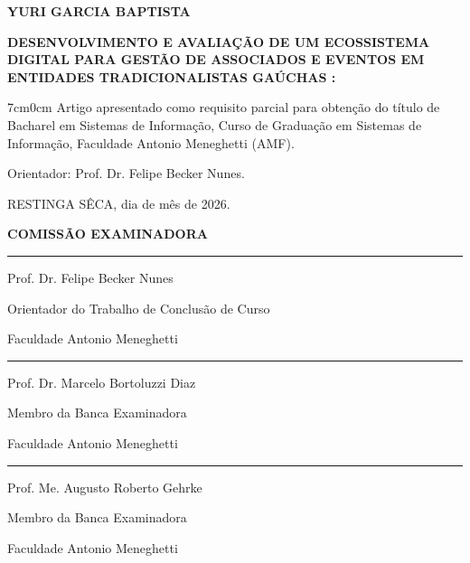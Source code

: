 \documentclass[12pt,a4paper]{article}
\newcommand{\autor}{YURI GARCIA BAPTISTA}
\newcommand{\titulo}{DESENVOLVIMENTO E AVALIAÇÃO DE UM ECOSSISTEMA DIGITAL PARA GESTÃO DE ASSOCIADOS E EVENTOS EM ENTIDADES TRADICIONALISTAS GAÚCHAS}
\newcommand{\subtitulo}{}
\newcommand{\grau}{Bacharel em Sistemas de Informação}
\newcommand{\orientador}{Prof. Dr. Felipe Becker Nunes}
\newcommand{\cidade}{RESTINGA SÊCA}
\newcommand{\datadefesa}{dia de mês de 2026}
\newcommand{\membrodois}{Prof. Dr. Marcelo Bortoluzzi Diaz}
\newcommand{\instituicaomembrodois}{Faculdade Antonio Meneghetti}
\newcommand{\membrotres}{Prof. Me. Augusto Roberto Gehrke}
\newcommand{\instituicaomembrotres}{Faculdade Antonio Meneghetti}
\newcommand{\imprimirtitulo}{%
  \titulo%
  \if\relax\detokenize\expandafter{\subtitulo}\relax
  \else: \subtitulo\fi
}
\begin{document}
\begin{titlepage}
  \thispagestyle{empty}
  \centering
  {\bfseries\MakeUppercase{\autor}\par}

  \vspace{2\baselineskip}
  {\bfseries\MakeUppercase{\imprimirtitulo}\par}

  \vspace{3\baselineskip}
  \begin{adjustwidth}{7cm}{0cm}
    \singlespacing
    \noindent Artigo apresentado como requisito parcial para obtenção do título de
    \grau, Curso de Graduação em Sistemas de Informação, Faculdade Antonio
    Meneghetti (AMF).

    \vspace{\baselineskip}
    \noindent Orientador: \orientador.
  \end{adjustwidth}

  \vspace{2\baselineskip}
  \raggedright
  \noindent \cidade, \datadefesa.

  \vspace{2\baselineskip}
  \centering
  {\bfseries COMISSÃO EXAMINADORA\par}

  \vspace{2\baselineskip}
  \rule{9cm}{0.4pt}\par
  \orientador\par
  Orientador do Trabalho de Conclusão de Curso\par
  Faculdade Antonio Meneghetti

  \vspace{2\baselineskip}
  \rule{9cm}{0.4pt}\par
  \membrodois\par
  Membro da Banca Examinadora\par
  \instituicaomembrodois

  \vspace{2\baselineskip}
  \rule{9cm}{0.4pt}\par
  \membrotres\par
  Membro da Banca Examinadora\par
  \instituicaomembrotres
\end{titlepage}

\clearpage
\setcounter{page}{3}
\hypersetup{pageanchor=true}
\thispagestyle{fancy}
\end{document}
